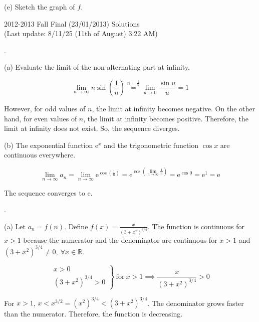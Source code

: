 \documentclass{article}
\begin{document}
\hfill

(e) Sketch the graph of $f$.

\newpage

\begin{center}
2012-2013 Fall Final (23/01/2013) Solutions\\
(Last update: 8/11/25 (11th of August) 3:22 AM)
\end{center}

.

\hfill

\noindent (a) Evaluate the limit of the non-alternating part at infinity.

\[\lim_{n\to\infty}n\sin\left(\frac1n\right)\overset{n=\textstyle \frac1u}{=}\lim_{u\to0}\frac{\sin u}u=1\]

\hfill

\noindent However, for odd values of $n$, the limit at infinity becomes negative. On the other hand, for even values of $n$, the limit at infinity becomes positive. Therefore, the limit at infinity does not exist. So, the sequence diverges.

\hfill

\noindent (b) The exponential function $\mathrm{e}^x$ and the trigonometric function $\cos x$ are continuous everywhere.

\[\lim_{n\to\infty}a_n=\lim_{n\to\infty}\mathrm{e}^{\displaystyle\cos\left(\frac1n\right)}=\mathrm{e}^{\displaystyle\cos\left(\lim_{n\to\infty}\frac1n\right)}=\mathrm{e}^{\cos0}=\mathrm{e}^1=\mathrm{e}\]

\hfill

\noindent The sequence converges to $\boxed{\mathrm{e}}$.

\hfill

.

\hfill

\noindent (a) Let $a_n=f(n)$. Define $\displaystyle f(x)=\frac x{\left(3+x^2\right)^{3/4}}$. The function is continuous for $x>1$ because the numerator and the denominator are continuous for $x>1$ and $\left(3+x^2\right)^{3/4}\neq0,\:\forall x\in\mathbb{R}$.

\[\left.\begin{array}{c}
x>0\\
\left(3+x^2\right)^{3/4}>0
\end{array}\right\}\:\text{for}\:x>1\implies\frac x{\left(3+x^2\right)^{3/4}}>0\]

\hfill

\noindent For $x>1$, $x<x^{3/2}=\left(x^2\right)^{3/4}<\left(3+x^2\right)^{3/4}$. The denominator grows faster than the numerator. Therefore, the function is decreasing.
\end{document}
